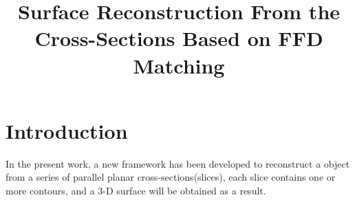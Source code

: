\documentclass[3p,times]{elsarticle}
\begin{document}
\begin{frontmatter}



\dochead{}

\title{Surface Reconstruction From the Cross-Sections Based on FFD Matching}


\author{}

\address{}

\begin{abstract}
\end{abstract}

\begin{keyword}



\end{keyword}

\end{frontmatter}


\section{Introduction}
\label{section1}
In the present work, a new framework has been developed to
reconstruct a object from a series of parallel planar
cross-sections(slices), each slice contains one or more contours, and
a 3-D surface will be obtained as a result.
\end{document}
